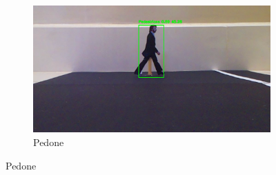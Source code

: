 \documentclass{article}
\begin{document}
\begin{figure}[h!]
    \centering
    \captionsetup[subfigure]{labelformat=parens,labelsep=space}
    \begin{subfigure}[b]{\textwidth}
        \centering
        \includegraphics[width=0.9\linewidth]{img/pedone.png}
        \caption{Pedone} 
        \label{fig:pedone}
    \end{subfigure}

    \vspace{0.8em} 


\end{figure}
\end{document}
